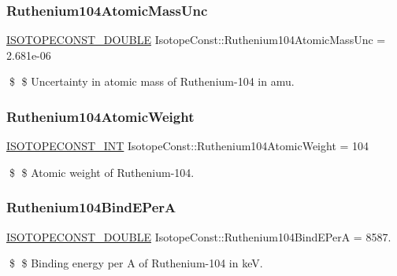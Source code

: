 \subsubsection{\texorpdfstring{Ruthenium104\+Atomic\+Mass\+Unc}{Ruthenium104AtomicMassUnc}}
{\footnotesize\ttfamily \mbox{\hyperlink{group___isotope_const-_macros_ga8f45a7272ce02c0b4c65c44636ed719a}{I\+S\+O\+T\+O\+P\+E\+C\+O\+N\+S\+T\+\_\+\+D\+O\+U\+B\+LE}} Isotope\+Const\+::\+Ruthenium104\+Atomic\+Mass\+Unc = 2.\+681e-\/06}

\$ \$ Uncertainty in atomic mass of Ruthenium-\/104 in amu. \mbox{\label{group___isotope_const-_ruthenium-_ru104_ga3aaffc4020ab8aff445eb86447915461}} 
\subsubsection{\texorpdfstring{Ruthenium104\+Atomic\+Weight}{Ruthenium104AtomicWeight}}
{\footnotesize\ttfamily \mbox{\hyperlink{group___isotope_const-_macros_ga5f18360b3e99483a35c32d789e62621c}{I\+S\+O\+T\+O\+P\+E\+C\+O\+N\+S\+T\+\_\+\+I\+NT}} Isotope\+Const\+::\+Ruthenium104\+Atomic\+Weight = 104}

\$ \$ Atomic weight of Ruthenium-\/104. \mbox{\label{group___isotope_const-_ruthenium-_ru104_gae0786d2ef7b8e39e8d7f3939766b7192}} 
\subsubsection{\texorpdfstring{Ruthenium104\+Bind\+E\+PerA}{Ruthenium104BindEPerA}}
{\footnotesize\ttfamily \mbox{\hyperlink{group___isotope_const-_macros_ga8f45a7272ce02c0b4c65c44636ed719a}{I\+S\+O\+T\+O\+P\+E\+C\+O\+N\+S\+T\+\_\+\+D\+O\+U\+B\+LE}} Isotope\+Const\+::\+Ruthenium104\+Bind\+E\+PerA = 8587.}

\$ \$ Binding energy per A of Ruthenium-\/104 in keV. \mbox{\label{group___isotope_const-_ruthenium-_ru104_ga43954b109e69058d0c82a1513cb40e38}} 

